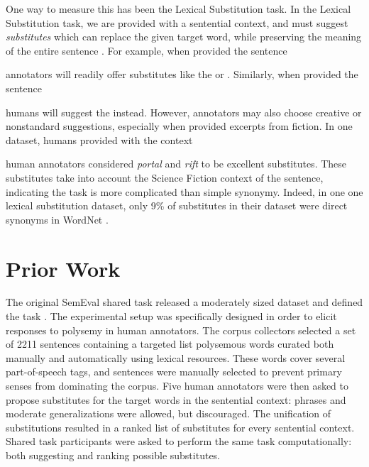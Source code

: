 One way to measure this has been the Lexical Substitution task. In
the Lexical Substitution task, we are provided with a sentential context, and
must suggest {\em substitutes} which can replace the given target word, while
preserving the meaning of the entire sentence
\cite{mccarthy:2007:semeval,biemann:2012:lrec,kremer:2014:eacl}. For
example, when provided the sentence
\begin{quote}
\end{quote}
annotators will readily offer substitutes like the  or
. Similarly, when provided the sentence
\begin{quote}
\end{quote}
humans will suggest the  instead. However, annotators
may also choose creative or nonstandard suggestions, especially when provided
excerpts from fiction. In one dataset, humans provided with the context
\begin{quote}
\end{quote}
human annotators considered {\em portal} and {\em rift} to be excellent
substitutes. These substitutes take into account the Science Fiction context of
the sentence, indicating the task is more complicated than simple synonymy.
Indeed, in one one lexical substitution dataset, only 9\% of substitutes in
their dataset were direct synonyms in WordNet \cite{kremer:2014:eacl}.

\section{Prior Work}

The original SemEval shared task released a moderately sized dataset and
defined the task \cite{mccarthy:2007:semeval}. The experimental setup was
specifically designed in order to elicit responses to polysemy in human
annotators. The corpus collectors selected a set of 2211 sentences containing
a targeted list polysemous words curated both manually and automatically using
lexical resources. These words cover several part-of-speech tags, and sentences
were manually selected to prevent primary senses from dominating the corpus.
Five human annotators were then asked to propose substitutes for the target
words in the sentential context: phrases and moderate generalizations were
allowed, but discouraged. The unification of substitutions resulted in a ranked
list of substitutes for every sentential context. Shared task participants
were asked to perform the same task computationally: both suggesting and
ranking possible substitutes.

